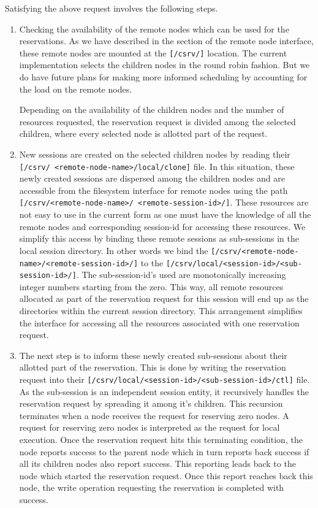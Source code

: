 Satisfying the above request involves the following steps.
\begin{enumerate}
\item Checking the availability of the remote nodes which can be used for the reservations.  
As we have described in the section of the remote node interface, these remote nodes are mounted at 
the \texttt{[/csrv/]} location.
The current implementation selects the children nodes in the round robin fashion.  But we do have 
future plans for making more informed scheduling by accounting for the load on the remote nodes.

Depending on the availability of the children nodes and the number of resources requested, the reservation request
is divided among the selected children, where every selected node is allotted part of the request.

\item   New sessions are created on the selected children nodes by reading their 
\texttt{[/csrv/ <remote-node-name>/local/clone]} file.
In this situation, these newly created sessions are dispersed among the children nodes and are accessible from the filesystem
interface for remote nodes using the path \texttt{[/csrv/<remote-node-name>/ <remote-session-id>/]}.
These resources are not easy to use in the current form as one must have the knowledge of all the remote nodes and 
corresponding session-id for accessing these resources.  We simplify this access by binding these remote
sessions as sub-sessions in the local session directory. In other words we bind 
the \texttt{[/csrv/<remote-node-name>/<remote-session-id>/]} to the \texttt{[/csrv/local/<session-id>/<sub-session-id>/]}.
The sub-session-id's used are monotonically increasing integer numbers starting from the zero.  This way,
all remote resources allocated as part of the reservation request for this session will end up as
the directories within the current session directory.  This arrangement simplifies the interface 
for accessing all the resources associated with one reservation request.

\item The next step is to inform these newly created sub-sessions about their allotted part of the reservation.
This is done by writing the reservation request into their \texttt{[/csrv/local/<session-id>/<sub-session-id>/ctl]}
file.  As the sub-session is an independent session entity, it recursively handles the reservation request by
spreading it among it's children.  This recursion terminates when a node receives the request for reserving zero nodes.
A request for reserving zero nodes is interpreted as the request for local execution.  Once the reservation request
hits this terminating condition, the node reports success to the parent node which in turn reports back success
if all its children nodes also report success.  This reporting leads back to the node which started the 
reservation request.  Once this report reaches back this node, the write operation requesting the reservation
is completed with success.


\end{enumerate}
